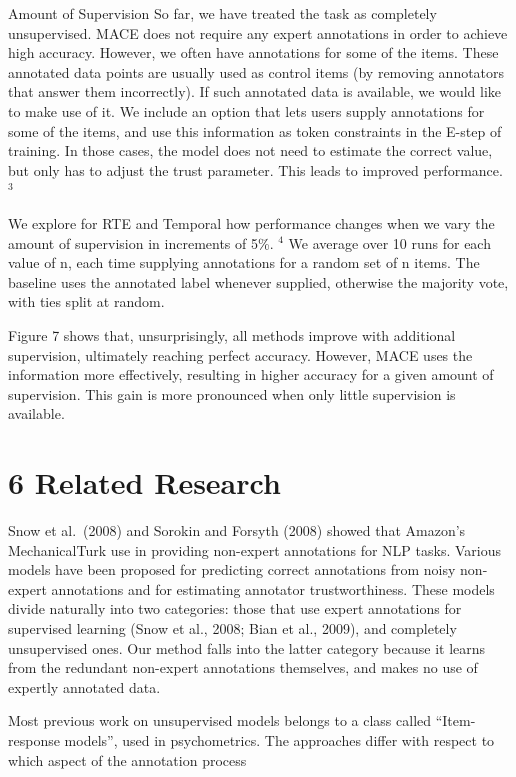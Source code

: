 \documentclass[
]{article}
\begin{document}
Amount of Supervision So far, we have treated the task as completely
unsupervised. MACE does not require any expert annotations in order to
achieve high accuracy. However, we often have annotations for some of
the items. These annotated data points are usually used as control items
(by removing annotators that answer them incorrectly). If such annotated
data is available, we would like to make use of it. We include an option
that lets users supply annotations for some of the items, and use this
information as token constraints in the E-step of training. In those
cases, the model does not need to estimate the correct value, but only
has to adjust the trust parameter. This leads to improved performance.
\(^{3}\)

We explore for RTE and Temporal how performance changes when we vary the
amount of supervision in increments of 5\%. \(^{4}\) We average over 10
runs for each value of n, each time supplying annotations for a random
set of n items. The baseline uses the annotated label whenever supplied,
otherwise the majority vote, with ties split at random.

Figure 7 shows that, unsurprisingly, all methods improve with additional
supervision, ultimately reaching perfect accuracy. However, MACE uses
the information more effectively, resulting in higher accuracy for a
given amount of supervision. This gain is more pronounced when only
little supervision is available.

\section{6 Related Research}\label{related-research}

Snow et al.~(2008) and Sorokin and Forsyth (2008) showed that Amazon's
MechanicalTurk use in providing non-expert annotations for NLP tasks.
Various models have been proposed for predicting correct annotations
from noisy non-expert annotations and for estimating annotator
trustworthiness. These models divide naturally into two categories:
those that use expert annotations for supervised learning (Snow et al.,
2008; Bian et al., 2009), and completely unsupervised ones. Our method
falls into the latter category because it learns from the redundant
non-expert annotations themselves, and makes no use of expertly
annotated data.

Most previous work on unsupervised models belongs to a class called
``Item-response models'', used in psychometrics. The approaches differ
with respect to which aspect of the annotation process
\end{document}
